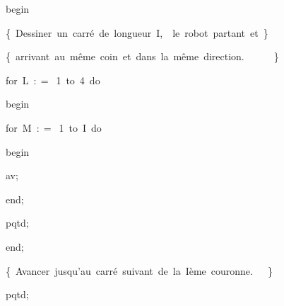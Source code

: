 {\vspace{\neglskip}\mbox{\blc  \blk\blk\blk\blk\blk\blk\blk\blk\idt  \mcl begin\idt }\par 
\vspace{\neglskip}\mbox{\blc  \blk\blk\blk\blk\blk\blk\blk\blk\blk\idt  \cmt  \{\ Dessiner\ un\ carré\ de\ longueur\ I,\ \ le\ robot\ partant\ et\ \}\idt }\par 
\vspace{\neglskip}\mbox{\blc  \blk\blk\blk\blk\blk\blk\blk\blk\blk\idt  \cmt  \{\ arrivant\ au\ même\ coin\ et\ dans\ la\ même\ direction.\ \ \ \ \ \ \}\idt }\par 
\pagebreak[3] 
\vspace{\neglskip}\mbox{\blc  \blk\blk\blk\blk\blk\blk\blk\blk\blk\idt  \mcl for\idt \ L\ $:$$=$\ 1\ \mcl to\idt \ 4\ \mcl do\idt }\par 
\vspace{\neglskip}\mbox{\blc  \blk\blk\blk\blk\blk\blk\blk\blk\blk\blk\idt  \mcl begin\idt }\par 
\pagebreak[3] 
\vspace{\neglskip}\mbox{\blc  \blk\blk\blk\blk\blk\blk\blk\blk\blk\blk\blk\idt  \mcl for\idt \ M\ $:$$=$\ 1\ \mcl to\idt \ I\ \mcl do\idt }\par 
\vspace{\neglskip}\mbox{\blc  \blk\blk\blk\blk\blk\blk\blk\blk\blk\blk\blk\blk\idt  \mcl begin\idt }\par 
\vspace{\neglskip}\mbox{\blc  \blk\blk\blk\blk\blk\blk\blk\blk\blk\blk\blk\blk\blk\idt  av$;$}\par 
\vspace{\neglskip}\mbox{\blc  \blk\blk\blk\blk\blk\blk\blk\blk\blk\blk\blk\blk\idt  \mcl end\idt $;$}\par 
\vspace{\neglskip}\mbox{\blc  \blk\blk\blk\blk\blk\blk\blk\blk\blk\blk\blk\idt  pqtd$;$}\par 
\vspace{\neglskip}\mbox{\blc  \blk\blk\blk\blk\blk\blk\blk\blk\blk\blk\idt  \mcl end\idt $;$}\par 
\vspace{\neglskip}\mbox{\blc  \blk\blk\blk\blk\blk\blk\blk\blk\blk\idt  \cmt  \{\ Avancer\ jusqu{'}au\ carré\ suivant\ de\ la\ Ième\ couronne.\ \ \ \}\idt }\par 
\vspace{\neglskip}\mbox{\blc  \blk\blk\blk\blk\blk\blk\blk\blk\blk\idt  pqtd$;$}\par 
}
